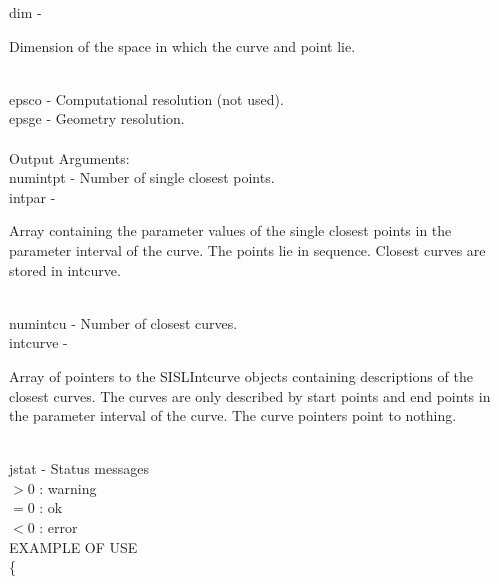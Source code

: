         \>\>    {\fov dim}      \> - \> \begin{minipg2}
                                Dimension of the space in which the
                                curve and point lie.
                                \end{minipg2}\\[0.8ex]
        \>\>    {\fov epsco}    \> - \> Computational resolution (not used).\\
        \>\>    {\fov epsge}    \> - \> Geometry resolution.\\
\\
        \>Output Arguments:\\
        \>\>    {\fov numintpt}\> - \>  Number of single closest points.\\
        \>\>    {\fov intpar}   \> - \> \begin{minipg2}
                                Array containing the parameter values of the
                                single closest points in the parameter
                                interval of the curve. The points lie in sequence.
                                Closest curves are stored in intcurve.
                                \end{minipg2}\\[0.8ex]
        \>\>    {\fov numintcu}\> - \>  Number of closest curves.\\
        \>\>    {\fov intcurve}\> - \>  \begin{minipg2}
                                Array of pointers to the SISLIntcurve objects
                                containing descriptions of the closest
                                curves. The curves are only described by
                                start points and end points in
                                the parameter interval of the curve. The
                                curve pointers point to nothing.
                                \end{minipg2}\\[0.8ex]
        \>\>    {\fov jstat}     \> - \> Status messages\\
                \>\>\>\>\>              $> 0$   : warning\\
                \>\>\>\>\>              $= 0$   : ok\\
                \>\>\>\>\>              $< 0$   : error\\
\newpagetabs
EXAMPLE OF USE\\
        \>      \{ \\
